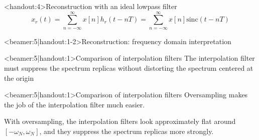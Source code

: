 \documentclass[10pt]{beamer}
\begin{document}
\begin{frame}<handout:4>{Reconstruction with an ideal lowpass filter}
\vspace{-0.5cm}
\begin{equation*}
x_r(t) = \sum_{n=-\infty}^{\infty} x[n]h_r(t-nT) = \sum_{n=-\infty}^{\infty} x[n]\mathrm{sinc}(t-nT)
\end{equation*}
\begin{center}
	\resizebox{0.6\linewidth}{!}{}
\end{center}
\end{frame}

\begin{frame}<beamer:5|handout:1-2>{Reconstruction: frequency domain interpretation}
\begin{center}
\resizebox{0.9\linewidth}{!}{}
\end{center}
\end{frame}

\begin{frame}<beamer:5|handout:1>{Comparison of interpolation filters}
The interpolation filter must suppress the spectrum replicas without distorting the spectrum centered at the origin 
\begin{center}
	\resizebox{\linewidth}{!}{}
\end{center}	
\end{frame}

\begin{frame}<beamer:5|handout:1>{Comparison of interpolation filters}
Oversampling makes the job of the interpolation filter much easier. 
\begin{center}
\resizebox{\linewidth}{!}{}
\end{center}
With oversampling, the interpolation filters look approximately flat around $[-\omega_N, \omega_N]$, and they suppress the spectrum replicas more strongly.
\end{frame}
\end{document}
